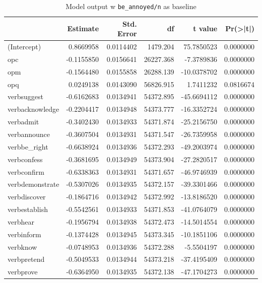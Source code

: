 \documentclass[12pt, a4paper]{article}
\begin{document}
\begin{table}[ht]
	\caption{Model output w \texttt{be\_annoyed/n} as baseline}
	\label{tab:annoyed-n}
	\centering

	\begin{tabular}{lrrrrr}
		\toprule
		  & Estimate & Std. Error & df & t value & Pr(>|t|)\\
		\midrule
		(Intercept) & 0.8669958 & 0.0114402 & 1479.204 & 75.7850523 & 0.0000000\\
		opc & -0.1155850 & 0.0156641 & 26227.368 & -7.3789836 & 0.0000000\\
		opm & -0.1564480 & 0.0155858 & 26288.139 & -10.0378702 & 0.0000000\\
		opq & 0.0249138 & 0.0143090 & 56826.915 & 1.7411232 & 0.0816674\\
		verbsuggest & -0.6162683 & 0.0134941 & 54372.895 & -45.6694112 & 0.0000000\\
		\addlinespace
		verbacknowledge & -0.2204417 & 0.0134948 & 54373.777 & -16.3352724 & 0.0000000\\
		verbadmit & -0.3402430 & 0.0134933 & 54371.874 & -25.2156750 & 0.0000000\\
		verbannounce & -0.3607504 & 0.0134931 & 54371.547 & -26.7359958 & 0.0000000\\
		verbbe\_right & -0.6638924 & 0.0134936 & 54372.293 & -49.2003974 & 0.0000000\\
		verbconfess & -0.3681695 & 0.0134949 & 54373.904 & -27.2820517 & 0.0000000\\
		\addlinespace
		verbconfirm & -0.6338363 & 0.0134931 & 54371.657 & -46.9746939 & 0.0000000\\
		verbdemonstrate & -0.5307026 & 0.0134935 & 54372.157 & -39.3301466 & 0.0000000\\
		verbdiscover & -0.1864716 & 0.0134942 & 54372.992 & -13.8186520 & 0.0000000\\
		verbestablish & -0.5542561 & 0.0134933 & 54371.853 & -41.0764079 & 0.0000000\\
		verbhear & -0.1956794 & 0.0134938 & 54372.473 & -14.5014554 & 0.0000000\\
		\addlinespace
		verbinform & -0.1374428 & 0.0134945 & 54373.345 & -10.1851106 & 0.0000000\\
		verbknow & -0.0748953 & 0.0134936 & 54372.288 & -5.5504197 & 0.0000000\\
		verbpretend & -0.5049533 & 0.0134944 & 54373.218 & -37.4195409 & 0.0000000\\
		verbprove & -0.6364950 & 0.0134935 & 54372.138 & -47.1704273 & 0.0000000\\

\end{tabular}
\end{table}
\end{document}
